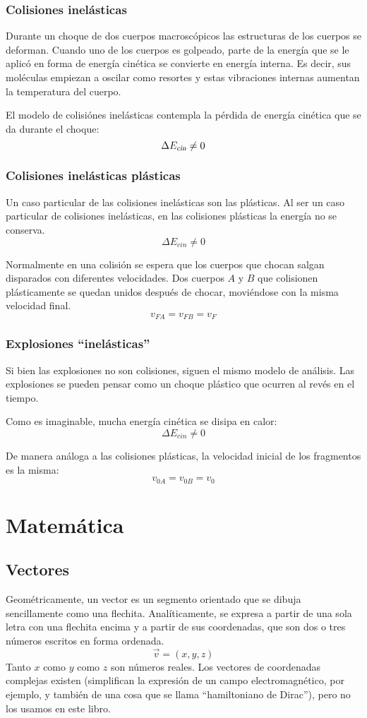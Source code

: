 \documentclass[a5paper,12pt,twoside]{book}
\begin{document}
\subsection{Colisiones inelásticas}

Durante un choque de dos cuerpos macroscópicos las estructuras de los cuerpos se deforman.
Cuando uno de los cuerpos es golpeado, parte de la energía que se le aplicó en forma de energía cinética se convierte en energía interna.
Es decir, sus moléculas empiezan a oscilar como resortes y estas vibraciones internas aumentan la temperatura del cuerpo.

El modelo de colisiónes inelásticas contempla la pérdida de energía cinética que se da durante el choque:
\[ \Delta {{E}_\textsl{{cin}}} \neq 0 \]


\subsection{Colisiones inelásticas plásticas}

Un caso particular de las colisiones inelásticas son las plásticas.
Al ser un caso particular de colisiones inelásticas, en las colisiones plásticas la energía no se conserva.
\[ \Delta E_{cin} \neq 0 \]

Normalmente en una colisión se espera que los cuerpos que chocan salgan disparados con diferentes velocidades.
Dos cuerpos $A$ y $B$ que colisionen plásticamente se quedan unidos después de chocar, moviéndose con la misma velocidad final.
\[ v_{FA} = v_{FB} = v_F \]


\subsection{Explosiones ``inelásticas''}

Si bien las explosiones no son colisiones, siguen el mismo modelo de análisis.
Las explosiones se pueden pensar como un choque plástico que ocurren al revés en el tiempo.

Como es imaginable, mucha energía cinética se disipa en calor:
\[ \Delta E_{cin} \neq 0 \]

De manera análoga a las colisiones plásticas, la velocidad inicial de los fragmentos es la misma:
\[ v_{0A} = v_{0B} = v_0 \]


\appendix
\chapter{Matemática}


\section{Vectores}
Geométricamente, un vector es un segmento orientado que se dibuja sencillamente como una flechita.
Analíticamente, se expresa a partir de una sola letra con una flechita encima y a partir de sus coordenadas, que son dos o tres números escritos en forma ordenada.
\[ \vec{v} = (x, y, z) \]
Tanto $x$ como $y$ como $z$ son números reales.
Los vectores de coordenadas complejas existen (simplifican la expresión de un campo electromagnético, por ejemplo, y también de una cosa que se llama ``hamiltoniano de Dirac''), pero no los usamos en este libro.
\end{document}
